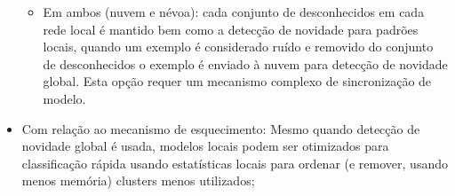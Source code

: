 \begin{itemize}
\begin{itemize}
    \item Em ambos (nuvem e névoa): cada conjunto de desconhecidos em cada rede
    local é mantido bem como a detecção de novidade para padrões locais,
    quando um exemplo é considerado ruído e removido do conjunto de
    desconhecidos o exemplo é enviado à nuvem para detecção de novidade global.
    Esta opção requer um mecanismo complexo de sincronização de modelo.

  \end{itemize}
    
  \item Com relação ao mecanismo de esquecimento:
  Mesmo quando detecção de novidade global é usada, modelos locais podem
  ser otimizados para classificação rápida usando estatísticas locais para
  ordenar (e remover, usando menos memória) clusters menos utilizados;


\end{itemize}
